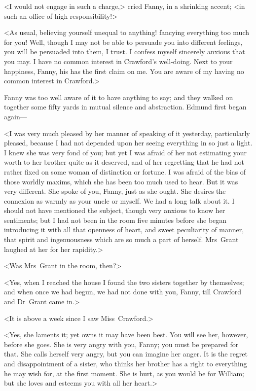 <I would not engage in such a charge,> cried Fanny, in a shrinking accent; <in such an office of high responsibility!>

<As usual, believing yourself unequal to anything! fancying everything too much for you! Well, though I may not be able to persuade you into different feelings, you will be persuaded into them, I trust. I confess myself sincerely anxious that you may. I have no common interest in Crawford's well-doing. Next to your happiness, Fanny, his has the first claim on me. You are aware of my having no common interest in Crawford.>

Fanny was too well aware of it to have anything to say; and they walked on together some fifty yards in mutual silence and abstraction. Edmund first began again—

<I was very much pleased by her manner of speaking of it yesterday, particularly pleased, because I had not depended upon her seeing everything in so just a light. I knew she was very fond of you; but yet I was afraid of her not estimating your worth to her brother quite as it deserved, and of her regretting that he had not rather fixed on some woman of distinction or fortune. I was afraid of the bias of those worldly maxims, which she has been too much used to hear. But it was very different. She spoke of you, Fanny, just as she ought. She desires the connexion as warmly as your uncle or myself. We had a long talk about it. I should not have mentioned the subject, though very anxious to know her sentiments; but I had not been in the room five minutes before she began introducing it with all that openness of heart, and sweet peculiarity of manner, that spirit and ingenuousness which are so much a part of herself. Mrs~Grant laughed at her for her rapidity.>

<Was Mrs~Grant in the room, then?>

<Yes, when I reached the house I found the two sisters together by themselves; and when once we had begun, we had not done with you, Fanny, till Crawford and Dr~Grant came in.>

<It is above a week since I saw Miss~Crawford.>

<Yes, she laments it; yet owns it may have been best. You will see her, however, before she goes. She is very angry with you, Fanny; you must be prepared for that. She calls herself very angry, but you can imagine her anger. It is the regret and disappointment of a sister, who thinks her brother has a right to everything he may wish for, at the first moment. She is hurt, as you would be for William; but she loves and esteems you with all her heart.>

